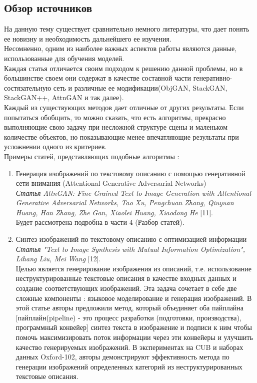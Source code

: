 \documentclass{article}
\begin{document}
    \newpage
    \begin{center} 
    \section{Обзор источников}
    \end{center} 
    \large 
    На данную тему существует сравнительно немного литературы, что дает понять ее новизну и необходимость дальнейшего ее изучения.\\
    Несомненно, одним из наиболее важных аспектов работы являются данные, использованные для обучения моделей.\\
    Каждая статья отличается своим подходом к решению данной проблемы, но в большинстве своем они содержат в качестве составной части генеративно-состязательную сеть и различные ее модификации(ObjGAN, StackGAN, StackGAN++, AttnGAN и так далее).\\
    Каждый из существующих методов дает отличные от других результаты. Если попытаться обобщить, то можно сказать, что есть алгоритмы, прекрасно выполняющие свою задачу при несложной структуре сцены и маленьком количестве объектов, но показывающие менее впечатляющие результаты при усложнении одного из критериев. \\ Примеры статей, представляющих подобные алгоритмы :
\begin{enumerate} 
\item Генерация изображений по текстовому описанию с помощью генеративной сети внимания (Attentional Generative Adversarial Networks)\\ 
\textit{Статья AttnGAN: Fine-Grained Text to Image Generation
with Attentional Generative Adversarial Networks,
      Tao Xu, Pengchuan Zhang, Qiuyuan Huang, Han Zhang, Zhe Gan, Xiaolei Huang, Xiaodong He} [11].\\
      Будет рассмотрена подробна в части 4 (Разбор статей).
\item Синтез изображений по текстовому описанию с оптимизацией информации\\ \textit{Статья "Text to Image Synthesis with Mutual Information Optimization", Lihang Liu, Mei Wang} [12].\\
Целью является
генерирование изображения из описаний, т.е.
использование неструктурированные текстовые описания в качестве входных данных и создание соответствующих изображений. Эта задача сочетает в себе две сложные компоненты : языковое моделирование и генерация изображений. В этой статье авторы предложили метод, который объединяет оба пайплайна [пайплайн(pipeline) - это процесс разработки (подготовки, производства), программный конвейер]
синтез текста в изображение и подписи к ним чтобы помочь максимизировать поток информации через эти конвейеры и улучшить качество генерируемых изображений. В экспериментах на CUB и наборах данных Oxford-102, авторы демонстрируют эффективность метода по генерации изображений определенных категорий из неструктурированных текстовые описания.\\
\end{enumerate} 
\end{document}
